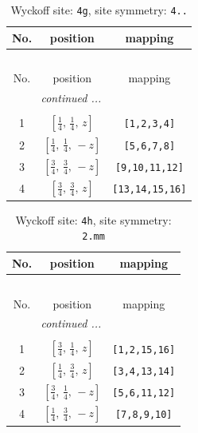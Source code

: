 \documentclass[fleqn,8pt]{jsarticle}
\begin{document}
\renewcommand{\arraystretch}{1.2}
\begin{longtable}{ccc}
\caption{Wyckoff site: {\tt 4g}, site symmetry: {\tt 4..}}
 \\
 \hline \hline
No. & position & mapping \\ \hline \endfirsthead

\multicolumn{2}{l}{\tablename\ \thetable{}} \\
 \hline \hline
No. & position & mapping \\ \hline \endhead

 \hline \hline
\multicolumn{2}{r}{\footnotesize\it continued ...} \\ \endfoot

 \hline \hline
\multicolumn{2}{r}{} \\ \endlastfoot

1 & $\left[ \frac{1}{4},\, \frac{1}{4},\, z \right]$ & {\tt [1,2,3,4]} \\ \hline
2 & $\left[ \frac{1}{4},\, \frac{1}{4},\, - z \right]$ & {\tt [5,6,7,8]} \\ \hline
3 & $\left[ \frac{3}{4},\, \frac{3}{4},\, - z \right]$ & {\tt [9,10,11,12]} \\ \hline
4 & $\left[ \frac{3}{4},\, \frac{3}{4},\, z \right]$ & {\tt [13,14,15,16]} \\
\end{longtable}
\renewcommand{\arraystretch}{1.2}
\begin{longtable}{ccc}
\caption{Wyckoff site: {\tt 4h}, site symmetry: {\tt 2.mm}}
 \\
 \hline \hline
No. & position & mapping \\ \hline \endfirsthead

\multicolumn{2}{l}{\tablename\ \thetable{}} \\
 \hline \hline
No. & position & mapping \\ \hline \endhead

 \hline \hline
\multicolumn{2}{r}{\footnotesize\it continued ...} \\ \endfoot

 \hline \hline
\multicolumn{2}{r}{} \\ \endlastfoot

1 & $\left[ \frac{3}{4},\, \frac{1}{4},\, z \right]$ & {\tt [1,2,15,16]} \\ \hline
2 & $\left[ \frac{1}{4},\, \frac{3}{4},\, z \right]$ & {\tt [3,4,13,14]} \\ \hline
3 & $\left[ \frac{3}{4},\, \frac{1}{4},\, - z \right]$ & {\tt [5,6,11,12]} \\ \hline
4 & $\left[ \frac{1}{4},\, \frac{3}{4},\, - z \right]$ & {\tt [7,8,9,10]} \\
\end{longtable}
\end{document}
